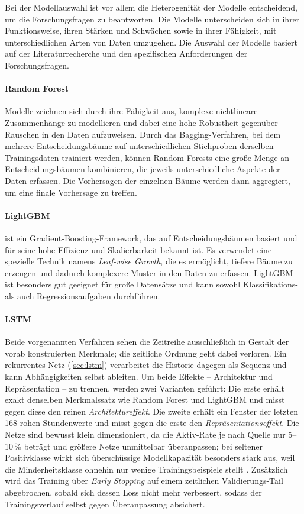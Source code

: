 Bei der Modellauswahl ist vor allem die Heterogenität der Modelle entscheidend, um die Forschungsfragen zu beantworten. Die Modelle unterscheiden sich in ihrer Funktionsweise, ihren Stärken und Schwächen sowie in ihrer Fähigkeit, mit unterschiedlichen Arten von Daten umzugehen. Die Auswahl der Modelle basiert auf der Literaturrecherche und den spezifischen Anforderungen der Forschungsfragen. 

\paragraph{Random Forest} Modelle zeichnen sich durch ihre Fähigkeit aus, komplexe nichtlineare Zusammenhänge zu modellieren und dabei eine hohe Robustheit gegenüber Rauschen in den Daten aufzuweisen. Durch das Bagging-Verfahren, bei dem mehrere Entscheidungsbäume auf unterschiedlichen Stichproben derselben Trainingsdaten trainiert werden, können Random Forests eine große Menge an Entscheidungsbäumen kombinieren, die jeweils unterschiedliche Aspekte der Daten erfassen. Die Vorhersagen der einzelnen Bäume werden dann aggregiert, um eine finale Vorhersage zu treffen. 

\paragraph{LightGBM} ist ein Gradient-Boosting-Framework, das auf Entscheidungsbäumen basiert und für seine hohe Effizienz und Skalierbarkeit bekannt ist. Es verwendet eine spezielle Technik namens \emph{Leaf-wise Growth}, die es ermöglicht, tiefere Bäume zu erzeugen und dadurch komplexere Muster in den Daten zu erfassen. LightGBM ist besonders gut geeignet für große Datensätze und kann sowohl Klassifikations- als auch Regressionsaufgaben durchführen.

\paragraph{LSTM} Beide vorgenannten Verfahren sehen die Zeitreihe ausschließlich in Gestalt der vorab konstruierten Merkmale; die zeitliche Ordnung geht dabei verloren. Ein rekurrentes Netz (\cref{sec:lstm}) verarbeitet die Historie dagegen als Sequenz und kann Abhängigkeiten selbst ableiten. Um beide Effekte -- Architektur und Repräsentation -- zu trennen, werden zwei Varianten geführt: Die erste erhält exakt denselben Merkmalssatz wie Random Forest und LightGBM und misst gegen diese den reinen \emph{Architektureffekt}. Die zweite erhält ein Fenster der letzten 168 rohen Stundenwerte und misst gegen die erste den \emph{Repräsentationseffekt}. Die Netze sind bewusst klein dimensioniert, da die Aktiv-Rate je nach Quelle nur 5--10\,\% beträgt und größere Netze unmittelbar überanpassen; bei seltener Positivklasse wirkt sich überschüssige Modellkapazität besonders stark aus, weil die Minderheitsklasse ohnehin nur wenige Trainingsbeispiele stellt \parencite{he2009imbalanced,japkowicz2002class}. Zusätzlich wird das Training über \emph{Early Stopping} auf einem zeitlichen Validierungs-Tail abgebrochen, sobald sich dessen Loss nicht mehr verbessert, sodass der Trainingsverlauf selbst gegen Überanpassung absichert.

